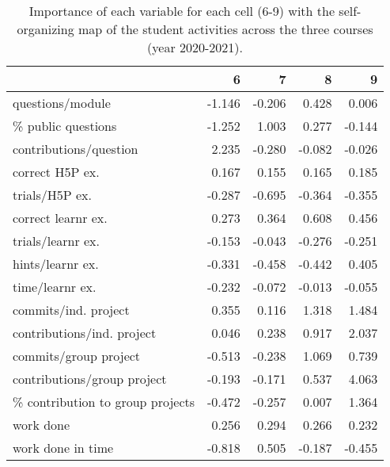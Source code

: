 \documentclass[
]{article}
\begin{document}
\begin{table}

\caption{\label{tab:somtab2}\label{tab:tab_som2} Importance of each variable for each cell (6-9) with the self-organizing map of the student activities across the three courses (year 2020-2021).}
\centering
\begin{tabular}[t]{l|r|r|r|r}
\hline
  & 6 & 7 & 8 & 9\\
\hline
questions/module & -1.146 & -0.206 & 0.428 & 0.006\\
\hline
\% public questions & -1.252 & 1.003 & 0.277 & -0.144\\
\hline
contributions/question & 2.235 & -0.280 & -0.082 & -0.026\\
\hline
correct H5P ex. & 0.167 & 0.155 & 0.165 & 0.185\\
\hline
trials/H5P ex. & -0.287 & -0.695 & -0.364 & -0.355\\
\hline
correct learnr ex. & 0.273 & 0.364 & 0.608 & 0.456\\
\hline
trials/learnr ex. & -0.153 & -0.043 & -0.276 & -0.251\\
\hline
hints/learnr ex. & -0.331 & -0.458 & -0.442 & 0.405\\
\hline
time/learnr ex. & -0.232 & -0.072 & -0.013 & -0.055\\
\hline
commits/ind. project & 0.355 & 0.116 & 1.318 & 1.484\\
\hline
contributions/ind. project & 0.046 & 0.238 & 0.917 & 2.037\\
\hline
commits/group project & -0.513 & -0.238 & 1.069 & 0.739\\
\hline
contributions/group project & -0.193 & -0.171 & 0.537 & 4.063\\
\hline
\% contribution to group projects & -0.472 & -0.257 & 0.007 & 1.364\\
\hline
work done & 0.256 & 0.294 & 0.266 & 0.232\\
\hline
work done in time & -0.818 & 0.505 & -0.187 & -0.455\\
\hline
\end{tabular}
\end{table}
\end{document}
